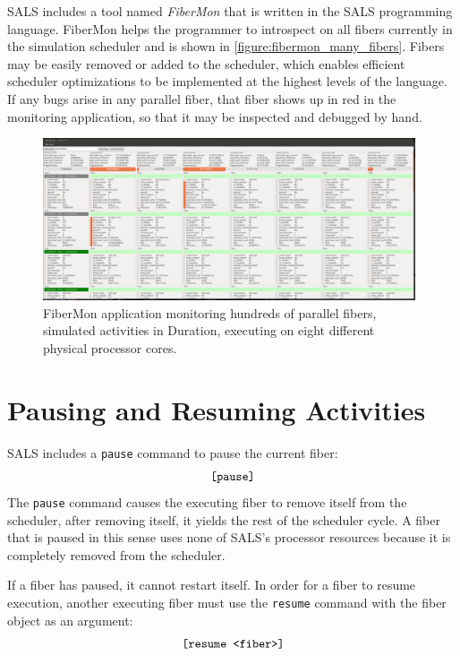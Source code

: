 SALS includes a tool named \emph{FiberMon} that is written in the SALS
programming language.  FiberMon helps the programmer to introspect on
all fibers currently in the simulation scheduler and is shown in
\autoref{figure:fibermon_many_fibers}.  Fibers may be easily removed
or added to the scheduler, which enables efficient scheduler
optimizations to be implemented at the highest levels of the language.
If any bugs arise in any parallel fiber, that fiber shows up in red in
the monitoring application, so that it may be inspected and debugged
by hand.
\begin{figure}[bth]
  \center
  \includegraphics[width=11cm]{gfx/fibermon_many_fibers}
  \caption[FiberMon application monitoring many fibers]{FiberMon
    application monitoring hundreds of parallel fibers, simulated
    activities in Duration, executing on eight different physical
    processor cores.}
  \label{figure:fibermon_many_fibers}
\end{figure}

\section{Pausing and Resuming Activities}

SALS includes a {\tt pause} command to pause the current fiber:
\begin{equation*}
\text{\tt [pause]}
\end{equation*}
The {\tt pause} command causes the executing fiber to remove itself
from the scheduler, after removing itself, it yields the rest of the
scheduler cycle.  A fiber that is paused in this sense uses none of
SALS's processor resources because it is completely removed from
the scheduler.

If a fiber has paused, it cannot restart itself.  In order for a fiber
to resume execution, another executing fiber must use the
{\tt resume} command with the fiber object as an argument:
\begin{equation*}
\text{\tt [resume <fiber>]}
\end{equation*}

